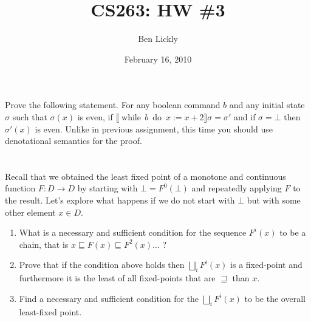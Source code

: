 \documentclass{article}
\title{CS263: HW \#3}
\author{Ben Lickly}
\date{February 16, 2010}
\newcommand{\problem}[1]
{\subsubsection*{} %
\vspace{-16pt} \section{} \vspace{-22pt} \qquad
#1%
\bigskip \bigskip
}
\newcommand{\while}[2]{\operatorname{while}\, #1\ \operatorname{do}\ #2}
\begin{document}
\maketitle
\problem{
Prove the following statement. For any boolean command $b$ and any initial state
$\sigma$ such that $\sigma(x)$ is even, if $\llbracket \while{b}{x := x + 2}
\rrbracket \sigma = \sigma'$ and if $\sigma = \bot$ then $\sigma'(x)$ is even.
Unlike in previous assignment, this time you should use denotational semantics
for the proof.
}
  
\problem{
Recall that we obtained the least fixed point of a monotone
and continuous function $F : D \to D$ by starting with $\bot = F^0(\bot)$ and
repeatedly applying $F$ to the result. Let's explore what happens if we do not
start with $\bot$ but with some other element $x \in D$.
\begin{enumerate}
  \item What is a necessary and sufficient condition for the sequence $F^i(x)$
  to be a chain, that is $x \sqsubseteq F(x) \sqsubseteq F^2 (x) \ldots$ ?

  \item Prove that if the condition above holds then $\bigsqcup_i F^i (x)$ is a
  fixed-point and furthermore it is the least of all fixed-points that are
  $\sqsupseteq$ than $x$.

  \item Find a necessary and sufficient condition for the $\bigsqcup_i F^i (x)$ to be
the overall least-fixed point.
\end{enumerate}
}
\end{document}
